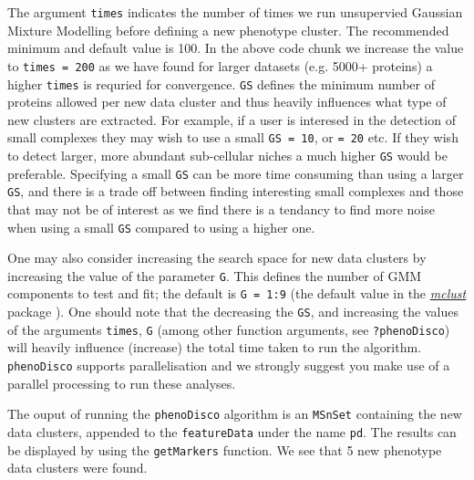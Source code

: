 The argument \texttt{times} indicates the number of times we run
unsupervied Gaussian Mixture Modelling before defining a new phenotype
cluster.  The recommended minimum and default value is 100. In the
above code chunk we increase the value to \texttt{times = 200} as we
have found for larger datasets (e.g. 5000+ proteins) a higher
\texttt{times} is requried for convergence. \texttt{GS} defines the
minimum number of proteins allowed per new data cluster and thus
heavily influences what type of new clusters are extracted. For
example, if a user is interesed in the detection of small complexes
they may wish to use a small \texttt{GS = 10}, or \texttt{= 20} etc.
If they wish to detect larger, more abundant sub-cellular niches a
much higher \texttt{GS} would be preferable. Specifying a small
\texttt{GS} can be more time consuming than using a larger
\texttt{GS}, and there is a trade off between finding interesting
small complexes and those that may not be of interest as we find there
is a tendancy to find more noise when using a small \texttt{GS}
compared to using a higher one.

One may also consider increasing the search space for new data
clusters by increasing the value of the parameter \texttt{G}. This
defines the number of GMM components to test and fit; the default is
\texttt{G = 1:9} (the default value in the
\href{https://cran.r-project.org/web/packages/mclust/index.html}{\textit{mclust}}
package \cite{mclust}). One should note that the decreasing the
\texttt{GS}, and increasing the values of the arguments
\texttt{times}, \texttt{G} (among other function arguments, see
\texttt{?phenoDisco}) will heavily influence (increase) the total time
taken to run the algorithm.  \texttt{phenoDisco} supports
parallelisation and we strongly suggest you make use of a parallel
processing to run these analyses.



The ouput of running the \texttt{phenoDisco} algorithm is an
\texttt{MSnSet} containing the new data clusters, appended to the
\texttt{featureData} under the name \texttt{pd}. The results can be
displayed by using the \texttt{getMarkers} function. We see that 5 new
phenotype data clusters were found.


